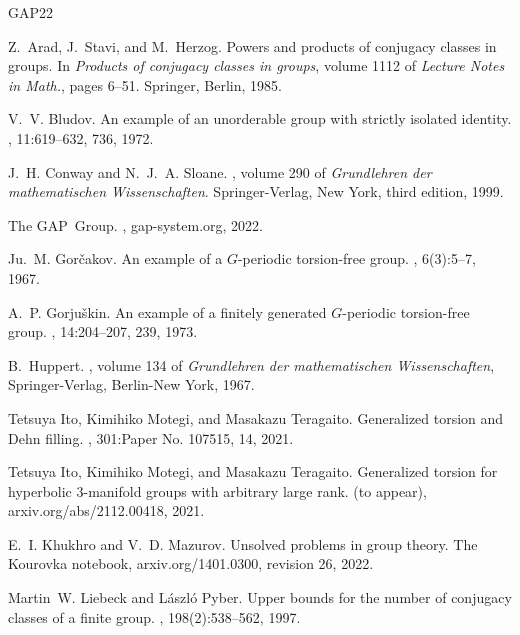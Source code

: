 \documentclass[12pt,leqno]{amsart}
\theoremstyle{definition}
\begin{document}
\begin{thebibliography}{GAP22}

Z.~Arad, J.~Stavi, and M.~Herzog.
\newblock Powers and products of conjugacy classes in groups.
\newblock In {\em Products of conjugacy classes in groups}, volume 1112 of {\em
  Lecture Notes in Math.}, pages 6--51. Springer, Berlin, 1985.

V.~V. Bludov.
\newblock An example of an unorderable group with strictly isolated identity.
, 11:619--632, 736, 1972.

J.~H. Conway and N.~J.~A. Sloane.
, volume 290 of {\em
  Grundlehren der mathematischen Wissenschaften}.
\newblock Springer-Verlag, New York, third edition, 1999.

The GAP~Group.
, gap-system.org, 
  2022.

Ju.~M. Gor\v{c}akov.
\newblock An example of a {$G$}-periodic torsion-free group.
, 6(3):5--7, 1967.

A.~P. Gorju\v{s}kin.
\newblock An example of a finitely generated {$G$}-periodic torsion-free group.
, 14:204--207, 239, 1973.

B.~Huppert.
,
\newblock volume 134 of {\em Grundlehren der mathematischen Wissenschaften}, 
  Springer-Verlag, Berlin-New York, 1967.

Tetsuya Ito, Kimihiko Motegi, and Masakazu Teragaito.
\newblock Generalized torsion and {D}ehn filling.
, 301:Paper No. 107515, 14, 2021.

Tetsuya Ito, Kimihiko Motegi, and Masakazu Teragaito.
\newblock Generalized torsion for hyperbolic 3-manifold groups with arbitrary
  large rank.
 (to appear), arxiv.org/abs/2112.00418, 2021.

E.~I. Khukhro and V.~D. Mazurov.
\newblock Unsolved problems in group theory. {T}he {K}ourovka notebook, arxiv.org/1401.0300, revision 26, 2022.

Martin~W. Liebeck and L\'{a}szl\'{o} Pyber.
\newblock Upper bounds for the number of conjugacy classes of a finite group.
, 198(2):538--562, 1997.


\end{thebibliography}
\end{document}
